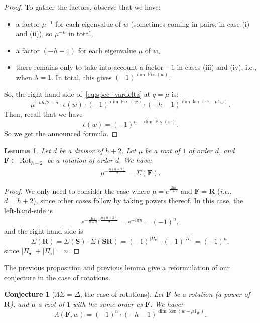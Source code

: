 \documentclass[11pt]{article}
\newtheorem{lemm}[theo]{Lemma}
\newtheorem{conj}[theo]{Conjecture}
\theoremstyle{definition}
\DeclareMathOperator{\rot}{Rot}
\newcommand{\FFF}{\mathbf{F}}
\newcommand{\RRR}{\mathbf{R}}
\newcommand{\SSS}{\mathbf{S}}
\DeclareMathOperator{\Fix}{Fix}
\begin{document}
\begin{proof}
    To gather the factors, observe that we have:
    \begin{itemize}
        \item a factor $\mu^{-1}$ for each eigenvalue of $w$ (sometimes coming in pairs, in case (i) and (ii)), so $\mu^{-n}$ in total,
        \item a factor $(-h-1)$ for each eigenvalue $\mu$ of $w$,
        \item there remains only to take into account a factor $-1$ in cases (iii) and (iv), i.e., when $\lambda=1$.  In total, this gives $(-1)^{\dim\Fix(w)}$. 
    \end{itemize}
    So, the right-hand side of~\eqref{eq:spec_vardelta} at $q=\mu$ is:
    \[
        \mu^{-nh/2-n} \cdot \epsilon(w) \cdot (-1)^{\dim\Fix(w)} \cdot (-h-1)^{\dim \ker( w - \mu 1_W) }.
    \]
    Then, recall that we have
    \[
        \epsilon(w) = (-1)^{n-\dim\Fix(w)}.
    \]
    So we get the announced formula.
\end{proof}

\begin{lemm}
    Let $d$ be a divisor of $h+2$.  Let $\mu$ be a root of $1$ of order $d$, and $\FFF \in \rot_{h+2}$ be a rotation of order $d$. We have:
    \begin{align}
        \mu^{-\frac{n(h+2)}{2}} = \Sigma(\FFF).
    \end{align}
\end{lemm}

\begin{proof}
    We only need to consider the case where $\mu = e^{\frac{2i\pi}{h+2}}$ and $\FFF = \RRR$ ({\it i.e.}, $d=h+2$), since other cases follow by taking powers thereof.  In this case, the left-hand-side is
    \[
        e^{-\frac{2i\pi}{h+2} \cdot \frac{n(h+2)}{2}}
            =
        e^{-i\pi n }
            =
        (-1)^n,
    \]
   and the right-hand side is
    \[
        \Sigma(\RRR) = \Sigma(\SSS) \cdot \Sigma(\SSS\RRR)  =  (-1)^{|\Pi_\bullet|} \cdot (-1)^{|\Pi_\circ|} = (-1)^n,
    \]
    since $|\Pi_\bullet| + |\Pi_\circ| = n$.
\end{proof}

The previous proposition and previous lemma give a reformulation of our conjecture in the case of rotations.

\begin{conj}[$\Lambda\Sigma = \Delta$, the case of rotations] \label{conj:rotcox}
    Let $\FFF$ be a rotation (a power of $\RRR$), and $\mu$ a root of $1$ with the same order as $\FFF$.  We have:
    \begin{equation} \label{eq:charrot}
        \Lambda(\FFF,w)
            =
        (-1)^n \cdot (-h-1)^{\dim\ker(w-\mu 1_W)}.
    \end{equation}
\end{conj}
\end{document}
